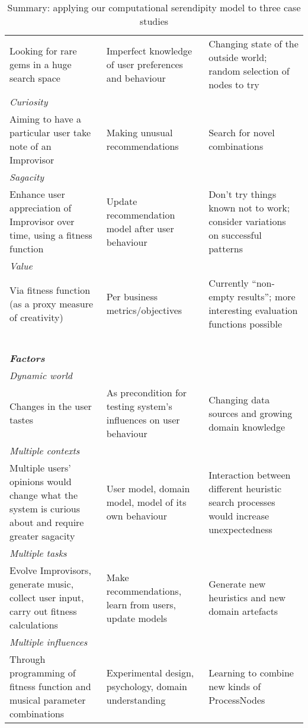 \begin{table}[p]
{\begin{tabular}{p{1.5in}@{\hspace{.1in}}p{1.5in}@{\hspace{.1in}}p{1.5in}}
Looking for rare gems in a huge search space
& Imperfect knowledge of user preferences and behaviour
& Changing state of the outside world; random selection of nodes to try \\
\multicolumn{3}{l}{\em Curiosity} \\[-.1cm]
Aiming to have a particular user take note of an Improvisor
& Making unusual recommendations
& Search for novel combinations \\
\multicolumn{3}{l}{\em Sagacity} \\[-.1cm]
Enhance user appreciation of Improvisor over time,
using a fitness function
& Update recommendation model after user behaviour 
& Don't try things known not to work; consider variations on successful patterns \\
\multicolumn{3}{l}{\em Value} \\[-.1cm]
Via fitness function (as a proxy measure of creativity)
& Per business metrics/objectives
& Currently ``non-empty results''; more interesting evaluation functions possible \\
\cline{1-3}
~\\[-.1cm]
\multicolumn{3}{l}{\em \textbf{Factors}} \\
\cline{1-3}
\multicolumn{3}{l}{\em Dynamic world} \\[-.1cm]
Changes in the user tastes
& As precondition for testing system's influences on user behaviour
& Changing data sources and growing domain knowledge \\
\multicolumn{3}{l}{\em Multiple contexts} \\[-.1cm]
Multiple users' opinions would change what the system is curious about and require greater sagacity
& User model, domain model, model of its own behaviour
& Interaction between different heuristic search processes would increase unexpectedness \\
\multicolumn{3}{l}{\em Multiple tasks} \\[-.1cm]
Evolve Improvisors, generate music, collect user input, carry out fitness calculations
& Make recommendations, learn from users, update models
& Generate new heuristics and new domain artefacts \\
\multicolumn{3}{l}{\em Multiple influences} \\[-.1cm]
Through programming of fitness function and musical parameter combinations
& Experimental design, psychology, domain understanding
& Learning to combine new kinds of ProcessNodes\\
\cline{1-3}
\end{tabular}
\par}
\normalsize
\bigskip

\caption{Summary: applying our computational serendipity model to three case studies\label{caseStudies}}
\end{table}%

